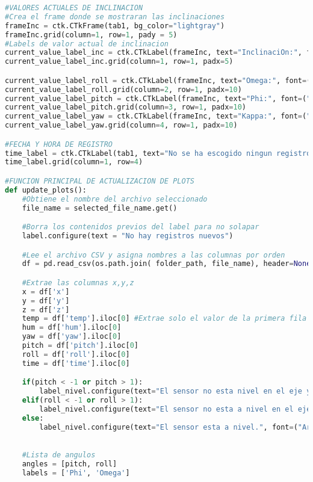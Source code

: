 \begin{lstlisting}[language=Python, caption=Código para interfaz gráfica de control y monitoreo]
#VALORES ACTUALES DE INCLINACION
#Crea el frame donde se mostraran las inclinaciones
frameInc = ctk.CTkFrame(tab1, bg_color="lightgray")
frameInc.grid(column=1, row=1, pady = 5)
#Labels de valor actual de inclinacion
current_value_label_inc = ctk.CTkLabel(frameInc, text="InclinaciOn:", font=("Arial", 14, "bold"))
current_value_label_inc.grid(column=1, row=1, padx=5)

current_value_label_roll = ctk.CTkLabel(frameInc, text="Omega:", font=("Arial", 14, "bold"), corner_radius=50, fg_color="darkgray")
current_value_label_roll.grid(column=2, row=1, padx=10)
current_value_label_pitch = ctk.CTkLabel(frameInc, text="Phi:", font=("Arial", 14, "bold"), corner_radius=50, fg_color="darkgray")
current_value_label_pitch.grid(column=3, row=1, padx=10)
current_value_label_yaw = ctk.CTkLabel(frameInc, text="Kappa:", font=("Arial", 14, "bold"), corner_radius=50, fg_color="darkgray")
current_value_label_yaw.grid(column=4, row=1, padx=10)

#FECHA Y HORA DE REGISTRO
time_label = ctk.CTkLabel(tab1, text="No se ha escogido ningun registro")
time_label.grid(column=1, row=4)

#FUNCION PRINCIPAL DE ACTUALIZACION DE PLOTS
def update_plots():
    #Obtiene el nombre del archivo seleccionado
    file_name = selected_file_name.get()

    #Borra los contenidos previos del label para no solapar
    label.configure(text = "No hay registros nuevos")

    #Lee el archivo CSV y asigna nombres a las columnas por orden
    df = pd.read_csv(os.path.join( folder_path, file_name), header=None, names=['x', 'y', 'z', 'temp', 'hum', 'yaw', 'pitch', 'roll', 'time'])

    #Extrae las columnas x,y,z
    x = df['x']
    y = df['y']
    z = df['z']
    temp = df['temp'].iloc[0] #Extrae solo el valor de la primera fila
    hum = df['hum'].iloc[0]
    yaw = df['yaw'].iloc[0]
    pitch = df['pitch'].iloc[0]
    roll = df['roll'].iloc[0]
    time = df['time'].iloc[0]

    if(pitch < -1 or pitch > 1):
        label_nivel.configure(text="El sensor no esta nivel en el eje y (Phi).", font=("Arial", 14, "bold"))
    elif(roll < -1 or roll > 1):
        label_nivel.configure(text="El sensor no esta a nivel en el eje x (Omega).", font=("Arial", 14, "bold"))
    else:
        label_nivel.configure(text="El sensor esta a nivel.", font=("Arial", 14, "bold"))
        

    #Lista de angulos
    angles = [pitch, roll]
    labels = ['Phi', 'Omega']


\end{lstlisting}
